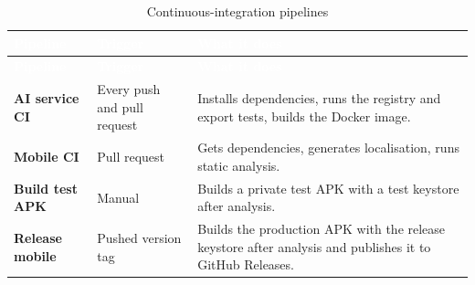 {\tabfont\rowband
\begin{longtable}{@{}>{\raggedright\arraybackslash}p{}>{\raggedright\arraybackslash}p{}>{\raggedright\arraybackslash}p{}@{}}
\caption{Continuous-integration pipelines}\label{tab:pipelines}\\
\rowcolor{najdanavy}\textcolor{white}{\sffamily\bfseries\small Pipeline} & \textcolor{white}{\sffamily\bfseries\small Trigger} & \textcolor{white}{\sffamily\bfseries\small What it does}\\
\endfirsthead
\rowcolor{najdanavy}\textcolor{white}{\sffamily\bfseries\small Pipeline} & \textcolor{white}{\sffamily\bfseries\small Trigger} & \textcolor{white}{\sffamily\bfseries\small What it does}\\
\endhead
\bottomrule\endlastfoot
\textbf{AI service CI} & Every push and pull request & Installs dependencies, runs the registry and export tests, builds the Docker image.\\
\textbf{Mobile CI} & Pull request & Gets dependencies, generates localisation, runs static analysis.\\
\textbf{Build test APK} & Manual & Builds a private test APK with a test keystore after analysis.\\
\textbf{Release mobile} & Pushed version tag & Builds the production APK with the release keystore after analysis and publishes it to GitHub Releases.\\
\end{longtable}}
